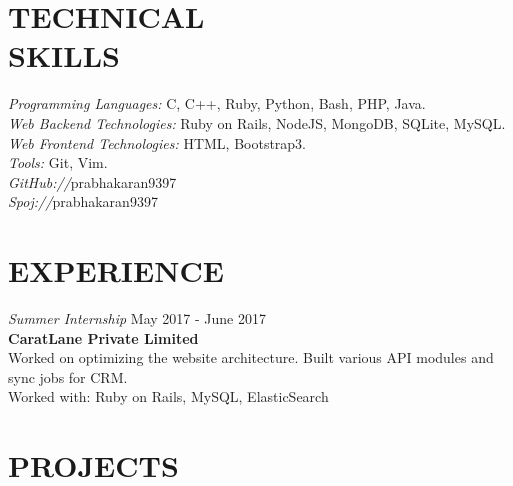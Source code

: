 \documentclass[margin, 10pt]{res} %
\begin{document}
\begin{resume}

\section{TECHNICAL \\ SKILLS} 

{\sl Programming Languages:} C, C++, Ruby, Python, Bash, PHP, Java. \\
{\sl Web Backend Technologies:} Ruby on Rails, NodeJS, MongoDB, SQLite, MySQL. \\
{\sl Web Frontend Technologies:} HTML, Bootstrap3. \\
{\sl Tools:} Git, Vim. \\
{\sl GitHub://}prabhakaran9397 \\
{\sl Spoj://}prabhakaran9397

 
\section{EXPERIENCE}

{\sl Summer Internship } \hfill May 2017 - June 2017 \\
{\bf CaratLane Private Limited} \\
Worked on optimizing the website architecture.
Built various API modules and sync jobs for CRM. \\
Worked with: Ruby on Rails, MySQL, ElasticSearch

 
\section{PROJECTS}


\end{resume}
\end{document}
